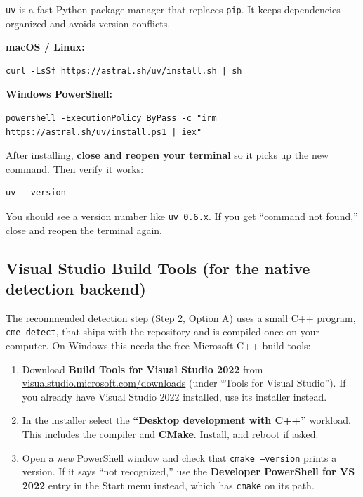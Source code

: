\documentclass[11pt]{article}
\newcommand{\code}[1]{\texttt{#1}}
\begin{document}
\code{uv} is a fast Python package manager that replaces \code{pip}.
It keeps dependencies organized and avoids version conflicts.

\textbf{macOS / Linux:}

\begin{lstlisting}
curl -LsSf https://astral.sh/uv/install.sh | sh
\end{lstlisting}

\textbf{Windows PowerShell:}

\begin{lstlisting}
powershell -ExecutionPolicy ByPass -c "irm https://astral.sh/uv/install.ps1 | iex"
\end{lstlisting}

After installing, \textbf{close and reopen your terminal} so it picks
up the new command. Then verify it works:

\begin{lstlisting}
uv --version
\end{lstlisting}

You should see a version number like \code{uv 0.6.x}. If you get
``command not found,'' close and reopen the terminal again.

\subsection{Visual Studio Build Tools (for the native detection backend)}

The recommended detection step (Step 2, Option A) uses a small C++
program, \code{cme\_detect}, that ships with the repository and is
compiled once on your computer. On Windows this needs the free
Microsoft C++ build tools:

\begin{enumerate}[leftmargin=*]
    \item Download \textbf{Build Tools for Visual Studio 2022} from
    \href{https://visualstudio.microsoft.com/downloads/}{visualstudio.microsoft.com/downloads}
    (under ``Tools for Visual Studio''). If you already have Visual
    Studio 2022 installed, use its installer instead.
    \item In the installer select the \textbf{``Desktop development
    with C++''} workload. This includes the compiler and
    \textbf{CMake}. Install, and reboot if asked.
    \item Open a \emph{new} PowerShell window and check that
    \code{cmake --version} prints a version. If it says ``not
    recognized,'' use the \textbf{Developer PowerShell for VS 2022}
    entry in the Start menu instead, which has \code{cmake} on its
    path.
\end{enumerate}
\end{document}
